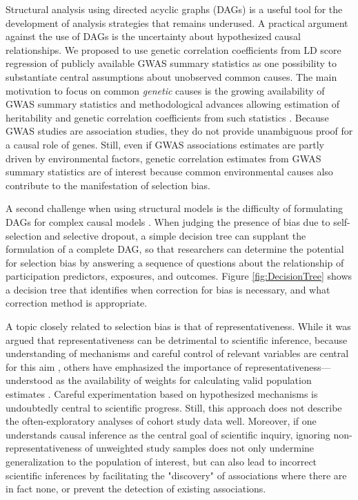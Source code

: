 \documentclass[12pt]{article}
\begin{document}
Structural analysis using directed acyclic graphs (DAGs) is a useful tool for the development of analysis strategies that remains underused. A practical argument against the use of DAGs is the uncertainty about hypothesized causal relationships. We proposed to use genetic correlation coefficients from LD score regression of publicly available GWAS summary statistics as one possibility to substantiate central assumptions about unobserved common causes. The main motivation to focus on common \emph{genetic} causes is the growing availability of GWAS summary statistics and methodological advances allowing estimation of heritability and genetic correlation coefficients from such statistics \cite{Bulik-Sullivan2015-er, Bulik-Sullivan2015-xn}. Because GWAS studies are association studies, they do not provide unambiguous proof for a causal role of genes. Still, even if GWAS associations estimates are partly driven by environmental factors, genetic correlation estimates from GWAS summary statistics are of interest because common environmental causes also contribute to the manifestation of selection bias.

A second challenge when using structural models is the difficulty of formulating DAGs for complex causal models \cite{Shrier2008-vr}. When judging the presence of bias due to self-selection and selective dropout, a simple decision tree can supplant the formulation of a complete DAG, so that researchers can determine the potential for selection bias by answering a sequence of questions about the relationship of participation predictors, exposures, and outcomes. Figure \ref{fig:DecisionTree} shows a decision tree that identifies when correction for bias is necessary, and what correction method is appropriate.

A topic closely related to selection bias is that of representativeness. While it was argued that representativeness can be detrimental to scientific inference, because understanding of mechanisms and careful control of relevant variables are central for this aim \cite{Rothman2013-qc}, others have emphasized the importance of representativeness---understood as the availability of weights for calculating valid population estimates \cite{Keiding2016-fv}. Careful experimentation based on hypothesized mechanisms is undoubtedly central to scientific progress. Still, this approach does not describe the often-exploratory analyses of cohort study data well. Moreover, if one understands causal inference as the central goal of scientific inquiry, ignoring non-representativeness of unweighted study samples does not only undermine generalization to the population of interest, but can also lead to incorrect scientific inferences by facilitating the "discovery" of associations where there are in fact none, or prevent the detection of existing associations.
\end{document}
